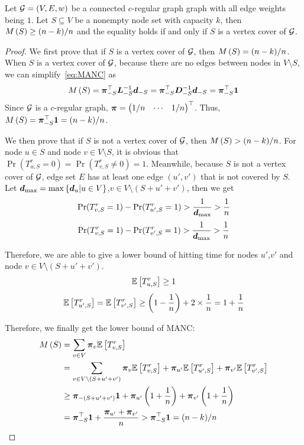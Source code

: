\documentclass[sigconf]{acmart}
\begin{document}
\begin{lemma}\label{lem:reduct}
    Let \(\mathcal{G}=(V,E,w)\) be a connected \(c\)-regular graph graph with all edge weights being \(1\).
    Let \(S\subseteq V\) be a nonempty node set with capacity \(k\), then \(M\left(S\right)\ge (n-k)/n\) and the equality holds if and only if \(S\) is a vertex cover of \(\mathcal{G}\).
\end{lemma}
\begin{proof}
    We first prove that if \(S\) is a vertex cover of \(\mathcal{G}\), then \(M\left(S\right)=(n-k)/n\).
    When \(S\) is a vertex cover of \(\mathcal{G}\), because there are no edges between nodes in \(V\setminus S\), we can simplify~\eqref{eq:MANC} as
    \[M\left(S\right)=\boldsymbol{\pi}_{-S}^\top\boldsymbol{L}_{-S}^{-1}\boldsymbol{d}_{-S}=\boldsymbol{\pi}_{-S}^\top\boldsymbol{D}_{-S}^{-1}\boldsymbol{d}_{-S}=\boldsymbol{\pi}_{-S}^\top\boldsymbol{1}\]
    Since \(\mathcal{G}\) is a \(c\)-regular graph, \(\boldsymbol{\pi}=\begin{pmatrix}1/n&\cdots&1/n\end{pmatrix}^\top\).
    Thus, \(M\left(S\right)=\boldsymbol{\pi}_{-S}^\top\boldsymbol{1}=(n-k)/n\).

    We then prove that if \(S\) is not a vertex cover of \(\mathcal{G}\), then \(M\left(S\right)>(n-k)/n\).
    For node \(u\in S\) and node \(v\in V\setminus S\), it is obvious that \(\Pr(T_{u,S}^r=0)=\Pr(T_{v,S}^r\neq0)=1\).
    Meanwhile, because \(S\) is not a vertex cover of \(\mathcal{G}\), edge set \(E\) has at least one edge \((u',v')\) that is not covered by \(S\).
    Let \(\boldsymbol{d}_{\max}=\max\left\{\boldsymbol{d}_u|u\in V \right\}\),\(v\in V\setminus(S+u'+v')\), then we get
    \[\Pr(T_{v,S}^r=1)-\Pr(T_{u',S}^r=1)>\frac{1}{\boldsymbol{d}_{\max}}>\frac{1}{n}\]
    \[\Pr(T_{v,S}^r=1)-\Pr(T_{v',S}^r=1)>\frac{1}{\boldsymbol{d}_{\max}}>\frac{1}{n}\]

    Therefore, we are able to give a lower bound of hitting time for nodes \(u'\),\(v'\) and node \(v\in V\setminus(S+u'+v')\).
    \[\mathbb{E}\left[T_{u,S}^r\right]\ge1\]
    \[\mathbb{E}\left[T_{u',S}^r\right]=\mathbb{E}\left[T_{v',S}^r\right]\ge\left( 1-\frac1n \right)+2\times\frac1n=1+\frac1n\]

    Therefore, we finally get the lower bound of MANC:
    \begin{align*}
        M\left(S\right) & =\sum_{v\in V}\boldsymbol{\pi}_v\mathbb{E}\left[T_{v,S}^r\right]                                                                             \\
                 & =\sum_{v\in V\setminus(S+u'+v')}\boldsymbol{\pi}_v\mathbb{E}\left[T_{v,S}^r\right]+\boldsymbol{\pi}_{u'}\mathbb{E}\left[T_{u',S}^r\right]+\boldsymbol{\pi}_{v'}\mathbb{E}\left[T_{v',S}^r\right] \\
                 & \ge\boldsymbol{\pi}_{-(S+u'+v')}\boldsymbol{1}+\boldsymbol{\pi}_{u'}\left( 1+\frac{1}{n} \right)+\boldsymbol{\pi}_{v'}\left( 1+\frac{1}{n} \right)                    \\
                 & =\boldsymbol{\pi}_{-S}^\top\boldsymbol{1}+\frac{\boldsymbol{\pi}_{u'}+\boldsymbol{\pi}_{v'}}n
        >\boldsymbol{\pi}_{-S}^\top\boldsymbol{1}=(n-k)/n
    \end{align*}
\end{proof}
\end{document}
